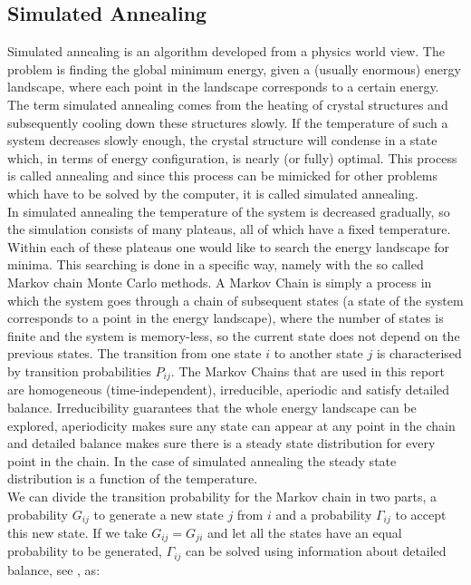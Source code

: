 \documentclass[10pt,a4paper]{article}
\begin{document}
\subsection{Simulated Annealing}
Simulated annealing is an algorithm developed from a physics world view. The problem is finding the global minimum energy, given a (usually enormous) energy landscape, where each point in the landscape corresponds to a certain energy. The term simulated annealing comes from the heating of crystal structures and subsequently cooling down these structures slowly. If the temperature of such a system decreases slowly enough, the crystal structure will condense in a state which, in terms of energy configuration, is nearly (or fully) optimal. This process is called annealing and since this process can be mimicked for other problems which have to be solved by the computer, it is called simulated annealing.\\
In simulated annealing the temperature of the system is decreased gradually, so the simulation consists of many plateaus, all of which have a fixed temperature. Within each of these plateaus one would like to search the energy landscape for minima. This searching is done in a specific way, namely with the so called Markov chain Monte Carlo methods. A Markov Chain is simply a process in which the system goes through a chain of subsequent states (a state of the system corresponds to a point in the energy landscape), where the number of states is finite and the system is memory-less, so the current state does not depend on the previous states. The transition from one state $i$ to another state $j$ is characterised by transition probabilities $P_{ij}$. The Markov Chains that are used in this report are homogeneous (time-independent), irreducible, aperiodic and satisfy detailed balance. Irreducibility guarantees that the whole energy landscape can be explored, aperiodicity makes sure any state can appear at any point in the chain and detailed balance makes sure there is a steady state distribution for every point in the chain. In the case of simulated annealing the steady state distribution is a function of the temperature. \\
We can divide the transition probability for the Markov chain in two parts, a probability $G_{ij}$ to generate a new state $j$ from $i$ and a probability $\Gamma_{ij}$ to accept this new state. If we take $G_{ij} = G_{ji}$ and let all the states have an equal probability to be generated, $\Gamma_{ij}$ can be solved using information about detailed balance, see \cite{book}, as:
\end{document}
